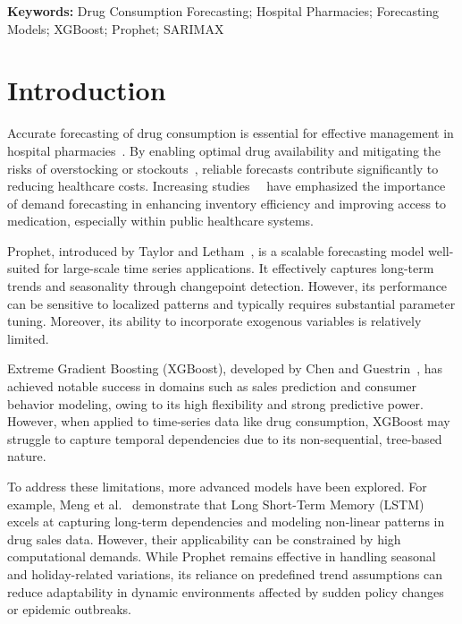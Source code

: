 \documentclass[12pt]{article}
\begin{document}
\vspace{2ex}
\noindent\textbf{Keywords:} Drug Consumption Forecasting; Hospital Pharmacies; Forecasting Models; XGBoost; Prophet; SARIMAX

\vspace{3ex}

\section{Introduction}

Accurate forecasting of drug consumption is essential for effective management in hospital pharmacies~\cite{who2016}. By enabling optimal drug availability and mitigating the risks of overstocking or stockouts~\cite{fda2021}, reliable forecasts contribute significantly to reducing healthcare costs. Increasing studies~\cite{bhat2024optimizing}~\cite{koala2021factors} have emphasized the importance of demand forecasting in enhancing inventory efficiency and improving access to medication, especially within public healthcare systems.

Prophet, introduced by Taylor and Letham~\cite{taylor2018forecasting}, is a scalable forecasting model well-suited for large-scale time series applications. It effectively captures long-term trends and seasonality through changepoint detection. However, its performance can be sensitive to localized patterns and typically requires substantial parameter tuning. Moreover, its ability to incorporate exogenous variables is relatively limited. 

Extreme Gradient Boosting (XGBoost), developed by Chen and Guestrin~\cite{chen2016xgboost}, has achieved notable success in domains such as sales prediction and consumer behavior modeling, owing to its high flexibility and strong predictive power. However, when applied to time-series data like drug consumption, XGBoost may struggle to capture temporal dependencies due to its non-sequential, tree-based nature.

To address these limitations, more advanced models have been explored. For example, Meng et al.~\cite{meng2021comparative} demonstrate that Long Short-Term Memory (LSTM) excels at capturing long-term dependencies and modeling non-linear patterns in drug sales data. However, their applicability can be constrained by high computational demands. While Prophet remains effective in handling seasonal and holiday-related variations, its reliance on predefined trend assumptions can reduce adaptability in dynamic environments affected by sudden policy changes or epidemic outbreaks.
\end{document}
